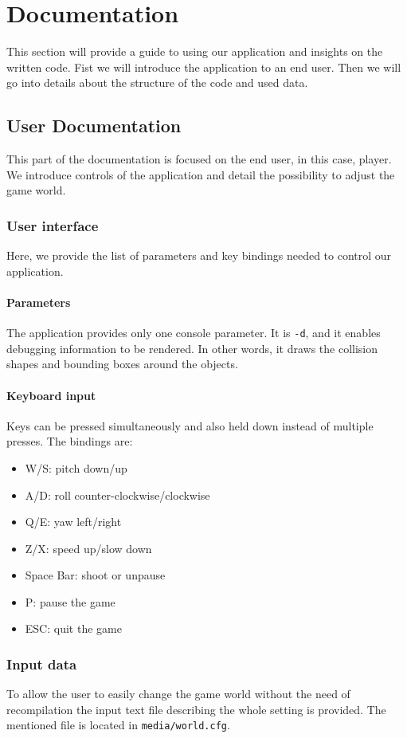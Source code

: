 \chapter{Documentation}
This section will provide a guide to using our application and insights on the written code. Fist we will introduce the application to an end user. Then we will go into details about the structure of the code and used data.
\section{User Documentation}
This part of the documentation is focused on the end user, in this case, player. We introduce controls of the application and detail the possibility to adjust the game world.
\subsection{User interface}
Here, we provide the list of parameters and key bindings needed to control our application.
\subsubsection{Parameters}
The application provides only one console parameter. It is {\tt -d}, and it enables debugging information to be rendered. In other words, it draws the collision shapes and bounding boxes around the objects.
\subsubsection{Keyboard input}
Keys can be pressed simultaneously and also held down instead of multiple presses. The bindings are:
\begin{itemize}
\item W/S: pitch down/up
\item A/D: roll counter-clockwise/clockwise 
\item Q/E: yaw left/right
\item Z/X: speed up/slow down
\item Space Bar: shoot or unpause
\item P: pause the game
\item ESC: quit the game
\end{itemize}


\subsection{Input data}
\label{sec:data}
To allow the user to easily change the game world without the need of recompilation the input text file describing the whole setting is provided. The mentioned file is located in {\tt media/world.cfg}. 
